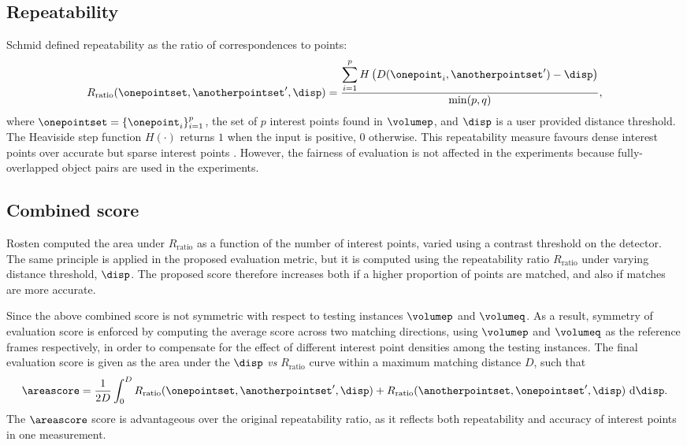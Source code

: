 \subsection{Repeatability}
Schmid \etal \cite{Schmid2000} defined repeatability as the ratio of correspondences to points:
\begin{equation}
R_\textrm{ratio}(\onepointset, \anotherpointset', \disp) = \frac{\displaystyle\sum_{i=1}^p H\left(D(\onepoint_i, \anotherpointset') - \disp\right)}{\min(p, q)},
\label{eqn/eval/repeatratio}
\end{equation}
where $\onepointset = \{\onepoint_i\}_{i=1}^{p}$, the set of $p$ interest points found in $\volumep$, and $\disp$ is a user provided distance threshold. 
The Heaviside step function $H(\cdot)$ returns $1$ when the input is positive, $0$ otherwise.
This repeatability measure favours dense interest points over accurate but sparse interest points \cite{Willis2009}. 
However, the fairness of evaluation is not affected in the experiments because fully-overlapped object pairs are used in the experiments.

\subsection{Combined score}
Rosten \etal \cite{Rosten2010} computed the area under $R_\textrm{ratio}$ as a function of the number of interest points, varied using a contrast threshold on the detector. 
The same principle is applied in the proposed evaluation metric, but it is computed using the repeatability ratio $R_\textrm{ratio}$ under varying distance threshold, $\disp$.  
The proposed score therefore increases both if a higher proportion of points are matched, and also if matches are more accurate. 

Since the above combined score is not symmetric with respect to testing instances $\volumep$ and $\volumeq$. As a result, symmetry of evaluation score is enforced by computing the average score across two matching directions, using $\volumep$ and $\volumeq$ as the reference frames respectively, in order to compensate for the effect of different interest point densities among the testing instances. The final evaluation score is given as the area under the $\disp$ \emph{vs} $R_\textrm{ratio}$ curve within a maximum matching distance $D$, such that  
\begin{equation}
\areascore=\frac{1}{2D}\int_{0}^{D}R_\textrm{ratio}(\onepointset, \anotherpointset', \disp) + R_\textrm{ratio}(\anotherpointset, \onepointset', \disp) ~ \textrm{d}\disp.
\label{eqn/eval/rptarea}
\end{equation}
The $\areascore$ score is advantageous over the original repeatability ratio, as it reflects both repeatability and accuracy of interest points in one measurement. 

